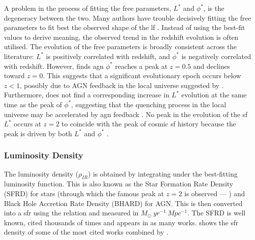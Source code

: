 A problem in the process of fitting the free parameters, $L^{*}$ and $\phi^{*}$, is the degeneracy between the two. Many authors have trouble decisively fitting the free parameters to fit best the observed shape of the \gls{lf} \citep{caputi_infrared_2007, hopkins_observational_2007, rodighiero_mid-_2010, casey_redshift_2012, gruppioni_herschel_2013, shen_bolometric_2020}. Instead of using the best-fit values to derive meaning, the observed trend in the redshift evolution is often utilised. The evolution of the free parameters is broadly consistent across the literature: $L^{*}$ is positively correlated with redshift, and $\phi^{*}$ is negatively correlated with redshift. However, \cite{delvecchio_tracing_2014} finds \gls{agn} $\phi^{*}$ reaches a peak at $z=0.5$ and declines toward $z=0$. This suggests that a significant evolutionary epoch occurs below $z<1$, possibly due to AGN feedback in the local universe suggested by \cite{katsianis_evolution_2017}. Furthermore, \cite{delvecchio_tracing_2014} does not find a corresponding increase in $L^{*}$ evolution at the same time as the peak of $\phi^{*}$, suggesting that the quenching process in the local universe may be accelerated by \gls{agn} feedback \citep{silk_unleashing_2013, fiore_agn_2017}. No peak in the evolution of the \gls{sf} $L^{*}$ occurs at $z=2$ to coincide with the peak of cosmic \gls{sf} history because the peak is driven by both $L^{*}$ and $\phi^{*}$ \citep{assef_mid-ir-_2011, wu_mid-infrared_2011}.

\subsubsection{Luminosity Density}
The luminosity density ($\rho_{IR}$) is obtained by integrating under the best-fitting luminosity function. This is also known as the Star Formation Rate Density (SFRD) for stars (through which the famous peak at $z=2$ is observed --- \citealp{madau_cosmic_2014}) and Black Hole Accretion Rate Density (BHARD) for AGN. This is then converted into a \gls{sfr} using the \cite{kennicutt_global_1998} relation and measured in $M_\odot \ yr^{-1} \ Mpc^{-1}$. The SFRD is well known, cited thousands of times and appears in as many works.  shows the \gls{sfr} density of some of the most cited works combined by \cite{traina_a3cosmos_2024}.

